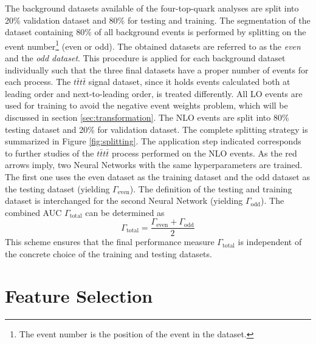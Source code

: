 The background datasets available of the four-top-quark analyses are split into 20\% validation dataset and 80\% for testing and training. The segmentation of the dataset containing 80\% of all background events is performed by splitting on the event number\footnote{The event number is the position of the event in the dataset.} (even or odd). The obtained datasets are referred to as the \textit{even} and the \textit{odd dataset}. This procedure is applied for each background dataset individually such that the three final datasets have a proper number of events for each process. The $t\bar{t}t\bar{t}$ signal dataset, since it holds events calculated both at leading order and next-to-leading order, is treated differently. All LO events are used for training to avoid the negative event weights problem, which will be discussed in section \ref{sec:transformation}. The NLO events are split into 80\% testing dataset and 20\% for validation dataset. The complete splitting strategy is summarized in Figure \ref{fig:splitting}. The application step indicated corresponds to further studies of the $t\bar{t}t\bar{t}$ process performed on the NLO events. As the red arrows imply, two Neural Networks with the same hyperparameters are trained. The first one uses the even dataset as the training dataset and the odd dataset as the testing dataset (yielding $\Gamma_{\text{even}}$). The definition of the testing and training dataset is interchanged for the second Neural Network (yielding $\Gamma_{\text{odd}}$). The combined AUC $\Gamma_{\text{total}}$ can be determined as
\begin{equation}
\Gamma_{\text{total}} = \frac{\Gamma_{\text{even}} + \Gamma_{\text{odd}}}{2}
\end{equation}
This scheme ensures that the final performance measure $\Gamma_{\text{total}}$ is independent of the concrete choice of the training and testing datasets. 

\section{Feature Selection}
\label{sec:feature_selection}

